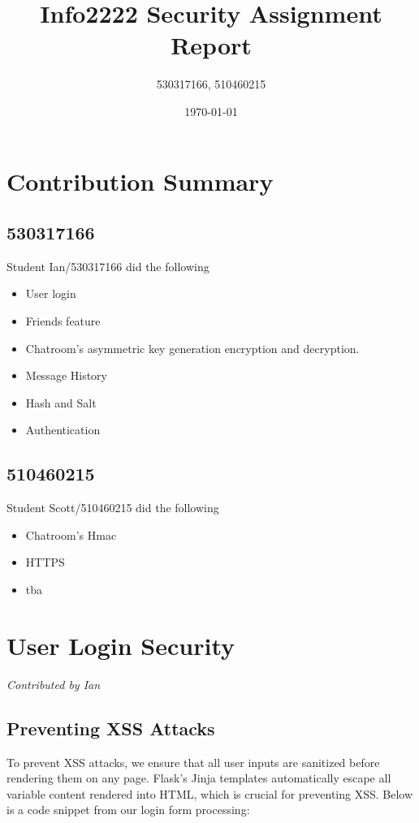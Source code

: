 \documentclass{article}
\title{Info2222 Security Assignment Report}
\author{530317166, 510460215}
\date{\today}
\begin{document}
\maketitle

\section*{Contribution Summary}

\subsection{530317166}
Student Ian/530317166 did the following
\begin{itemize}
    \item User login
    \item Friends feature
    \item Chatroom's asymmetric key generation encryption and decryption. 
    \item Message History
    \item Hash and Salt
    \item Authentication
\end{itemize}

\subsection{510460215}
Student Scott/510460215 did the following
\begin{itemize}
    \item Chatroom's Hmac 
    \item HTTPS
    \item tba
\end{itemize}

\section{User Login Security}
\textit{Contributed by Ian}

\subsection{Preventing XSS Attacks}
To prevent XSS attacks, we ensure that all user inputs are sanitized before rendering them on any page. Flask’s Jinja templates automatically escape all variable content rendered into HTML, which is crucial for preventing XSS. Below is a code snippet from our login form processing:
\end{document}
